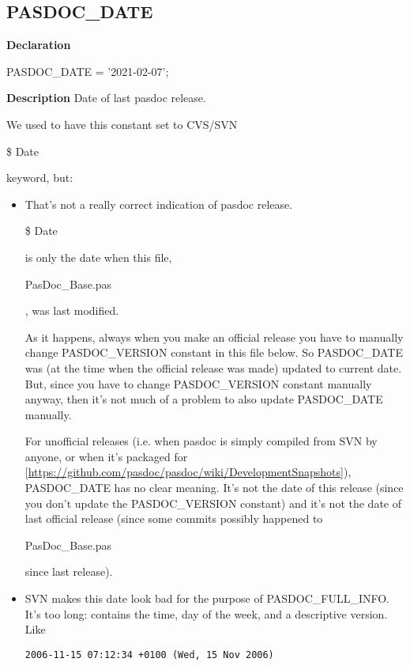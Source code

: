 \documentclass{report}
\newif\ifpdf
\begin{document}
\subsection*{PASDOC{\_}DATE}
\fi
\label{PasDoc_Versions-PASDOC_DATE}
\begin{list}{}{
\setlength{\itemindent}{0cm}
\setlength{\listparindent}{0cm}
\setlength{\leftmargin}{\evensidemargin}
\addtolength{\leftmargin}{\tmplength}
\settowidth{\labelsep}{X}
\addtolength{\leftmargin}{\labelsep}
\setlength{\labelwidth}{\tmplength}
}
\item[\textbf{Declaration}\hfill]
\ifpdf
\begin{flushleft}
\fi
\begin{ttfamily}
PASDOC{\_}DATE = '2021-02-07';\end{ttfamily}

\ifpdf
\end{flushleft}
\fi

\par
\item[\textbf{Description}]
Date of last pasdoc release.

We used to have this constant set to CVS/SVN \begin{ttfamily}{\$} Date\end{ttfamily} keyword, but: \begin{itemize}
\item That's not a really correct indication of pasdoc release. \begin{ttfamily}{\$} Date\end{ttfamily} is only the date when this file, \begin{ttfamily}PasDoc{\_}Base.pas\end{ttfamily}, was last modified.

As it happens, always when you make an official release you have to manually change PASDOC{\_}VERSION constant in this file below. So PASDOC{\_}DATE was (at the time when the official release was made) updated to current date. But, since you have to change PASDOC{\_}VERSION constant manually anyway, then it's not much of a problem to also update PASDOC{\_}DATE manually.

For unofficial releases (i.e. when pasdoc is simply compiled from SVN by anyone, or when it's packaged for [\href{https://github.com/pasdoc/pasdoc/wiki/DevelopmentSnapshots}{https://github.com/pasdoc/pasdoc/wiki/DevelopmentSnapshots}]), PASDOC{\_}DATE has no clear meaning. It's not the date of this release (since you don't update the PASDOC{\_}VERSION constant) and it's not the date of last official release (since some commits possibly happened to \begin{ttfamily}PasDoc{\_}Base.pas\end{ttfamily} since last release). 
\item SVN makes this date look bad for the purpose of PASDOC{\_}FULL{\_}INFO. It's too long: contains the time, day of the week, and a descriptive version. Like \begin{verbatim}2006-11-15 07:12:34 +0100 (Wed, 15 Nov 2006)\end{verbatim}


\end{itemize}
\end{list}
\end{document}
